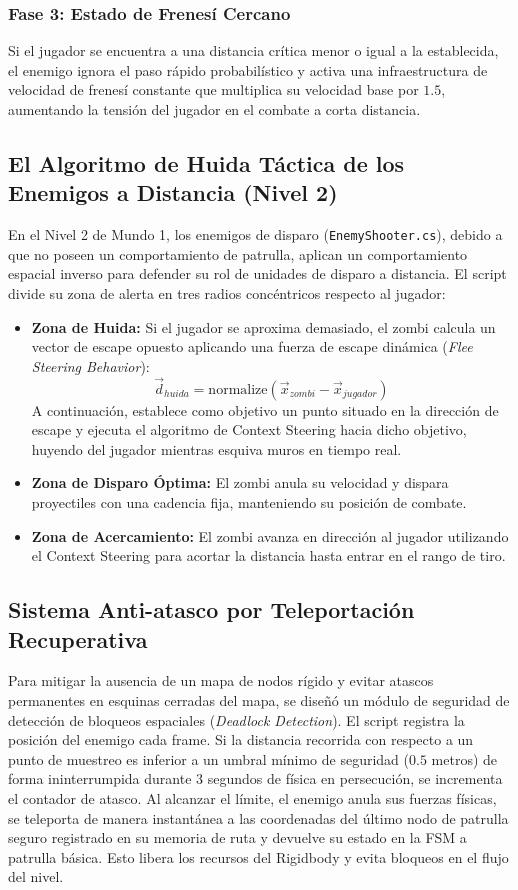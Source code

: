 \subsubsection{Fase 3: Estado de Frenesí Cercano}
Si el jugador se encuentra a una distancia crítica menor o igual a la establecida, el enemigo ignora el paso rápido probabilístico y activa una infraestructura de velocidad de frenesí constante que multiplica su velocidad base por $1.5$, aumentando la tensión del jugador en el combate a corta distancia.

\subsection{El Algoritmo de Huida Táctica de los Enemigos a Distancia (Nivel 2)}
En el Nivel 2 de Mundo 1, los enemigos de disparo (\texttt{EnemyShooter.cs}), debido a que no poseen un comportamiento de patrulla, aplican un comportamiento espacial inverso para defender su rol de unidades de disparo a distancia. El script divide su zona de alerta en tres radios concéntricos respecto al jugador:
\begin{itemize}
    \item \textbf{Zona de Huida:} Si el jugador se aproxima demasiado, el zombi calcula un vector de escape opuesto aplicando una fuerza de escape dinámica (\textit{Flee Steering Behavior}):
    \begin{equation}
    \vec{d}_{huida} = \mbox{normalize}(\vec{x}_{zombi} - \vec{x}_{jugador})
    \end{equation}
    A continuación, establece como objetivo un punto situado en la dirección de escape y ejecuta el algoritmo de Context Steering hacia dicho objetivo, huyendo del jugador mientras esquiva muros en tiempo real.
    \item \textbf{Zona de Disparo Óptima:} El zombi anula su velocidad y dispara proyectiles con una cadencia fija, manteniendo su posición de combate.
    \item \textbf{Zona de Acercamiento:} El zombi avanza en dirección al jugador utilizando el Context Steering para acortar la distancia hasta entrar en el rango de tiro.
\end{itemize}

\subsection{Sistema Anti-atasco por Teleportación Recuperativa}
Para mitigar la ausencia de un mapa de nodos rígido y evitar atascos permanentes en esquinas cerradas del mapa, se diseñó un módulo de seguridad de detección de bloqueos espaciales (\textit{Deadlock Detection}). El script registra la posición del enemigo cada frame. Si la distancia recorrida con respecto a un punto de muestreo es inferior a un umbral mínimo de seguridad ($0.5$ metros) de forma ininterrumpida durante $3$ segundos de física en persecución, se incrementa el contador de atasco. 
Al alcanzar el límite, el enemigo anula sus fuerzas físicas, se teleporta de manera instantánea a las coordenadas del último nodo de patrulla seguro registrado en su memoria de ruta y devuelve su estado en la FSM a patrulla básica. Esto libera los recursos del Rigidbody y evita bloqueos en el flujo del nivel.

